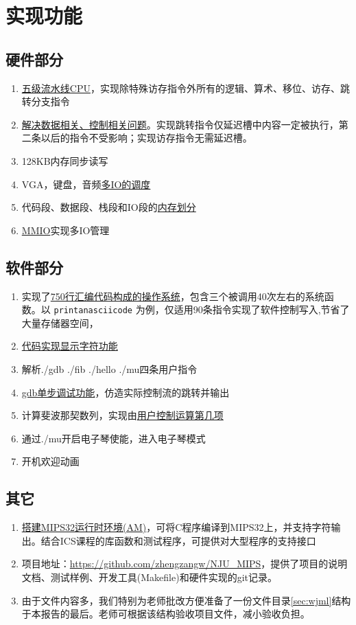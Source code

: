 \chapter{实现功能}
\section{硬件部分}
\begin{enumerate}
    \item \uline{五级流水线CPU}，实现除特殊访存指令外所有的逻辑、算术、移位、访存、跳转分支指令
    \item \uline{解决数据相关、控制相关问题}。实现跳转指令仅延迟槽中内容一定被执行，第二条以后的指令不受影响；实现访存指令无需延迟槽。
    \item 128KB内存同步读写
    \item VGA，键盘，音频\uline{多IO的调度}
    \item 代码段、数据段、栈段和IO段的\uline{内存划分}
    \item \uline{MMIO}实现多IO管理
\end{enumerate}
\section{软件部分}
\begin{enumerate}
    \item 实现了\uline{750行汇编代码构成的操作系统}，包含三个被调用40次左右的系统函数。以 \verb|printanasciicode| 为例，仅适用90条指令实现了软件控制写入,节省了大量存储器空间，
    \item \uline{代码实现显示字符功能}
    \item 解析./gdb ./fib ./hello ./mu四条用户指令
    \item \uline{gdb单步调试功能}，仿造实际控制流的跳转并输出
    \item 计算斐波那契数列，实现由\uline{用户控制运算第几项}
    \item 通过./mu开启电子琴使能，进入电子琴模式
    \item 开机欢迎动画
\end{enumerate}
\section{其它}
\begin{enumerate}
    \item \uline{搭建MIPS32运行时环境(AM)}，可将C程序编译到MIPS32上，并支持字符输出。结合ICS课程的库函数和测试程序，可提供对大型程序的支持接口
    \item 项目地址：\href{https://github.com/zhengzangw/NJU_MIPS}{https://github.com/zhengzangw/NJU\_MIPS}，提供了项目的说明文档、测试样例、开发工具(Makefile)和硬件实现的git记录。
    \item 由于文件内容多，我们特别为老师批改方便准备了一份文件目录\ref{sec:wjml}结构于本报告的最后。老师可根据该结构验收项目文件，减小验收负担。
\end{enumerate}
